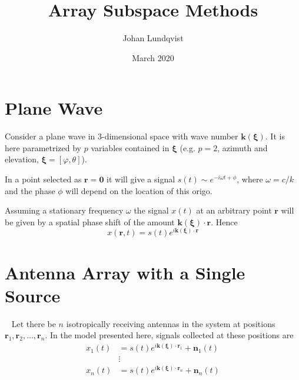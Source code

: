 \documentclass[11pt]{article}
\title{Array Subspace Methods}
\author{Johan Lundqvist}
\date{March 2020}
\newcommand{\vct}[1]{\boldsymbol{#1}}
\begin{document}
\maketitle

\section{Plane Wave}
\label{sec:plane-wave}
Consider a plane wave in 3-dimensional space with wave number $\vct{k}(\vct{\xi})$.
It is here parametrized by $p$ variables contained in $\vct{\xi}$ (e.g. $p=2$, azimuth and elevation, $\vct{\xi}=[\varphi, \theta]$).

In a point selected as $\vct{r}=\vct{0}$ it will give a signal $s(t)\sim e^{-i\omega t+\phi}$, where $\omega=c/k$ and the phase $\phi$ will depend on the location of this origo.

Assuming a stationary frequency $\omega$ the signal $x(t)$ at an arbitrary point $\vct{r}$ will be given by a spatial phase shift of the amount ${\vct{k}(\vct{\xi})}\cdot{\vct{r}}$.
Hence
\begin{equation}
    x(\vct{r},t) = s(t)e^{i{\vct{k}(\vct{\xi})}\cdot{\vct{r}}}
\end{equation}

\section{Antenna Array with a Single Source}
\label{sec:antenna-array-with-a-single-source}
~\cite{Paulraj2016SubspaceMF,GonenMendel}
Let there be $n$ isotropically receiving antennas in the system at positions $\vct{r}_1, \vct{r}_2, \dots, \vct{r}_n$.
In the model presented here, signals collected at these positions are
\begin{equation}
    \begin{split}
        x_1(t)& = s(t)e^{i{\vct{k}(\vct{\xi})}\cdot{\vct{r}_1}} + \vct{n}_1(t)\\
        &\vdots\\
        x_n(t)& = s(t)e^{i{\vct{k}(\vct{\xi})}\cdot{\vct{r}_n}} + \vct{n}_n(t)
    \end{split}
\end{equation}
\end{document}
